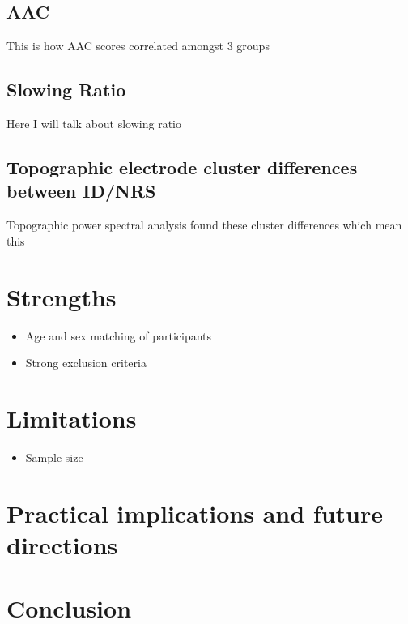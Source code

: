 \documentclass[12pt,a4paper,]{report}
\providecommand{\tightlist}{%
  \setlength{\itemsep}{0pt}\setlength{\parskip}{0pt}}
\begin{document}
\subsection{AAC}\label{aac}

This is how AAC scores correlated amongst 3 groups

\subsection{Slowing Ratio}\label{slowing-ratio}

Here I will talk about slowing ratio

\subsection{Topographic electrode cluster differences between
ID/NRS}\label{topographic-electrode-cluster-differences-between-idnrs}

Topographic power spectral analysis found these cluster differences
which mean this

\section{Strengths}\label{strengths}

\begin{itemize}
\tightlist
\item
  Age and sex matching of participants
\item
  Strong exclusion criteria
\end{itemize}

\section{Limitations}\label{limitations}

\begin{itemize}
\tightlist
\item
  Sample size
\end{itemize}

\section{Practical implications and future
directions}\label{practical-implications-and-future-directions}

\section{Conclusion}\label{conclusion}
\end{document}
